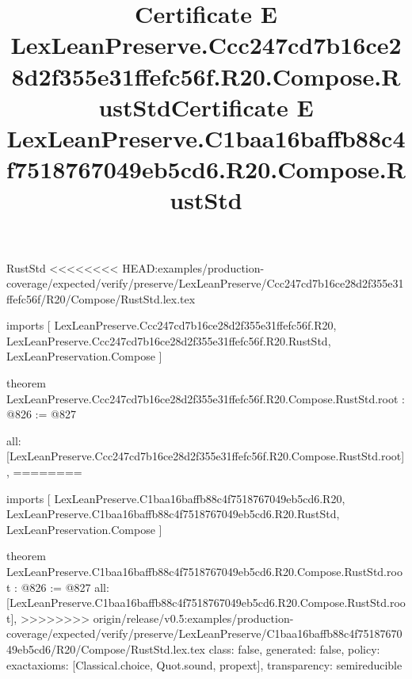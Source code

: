 \begin{lexlean}{RustStd}
<<<<<<<< HEAD:examples/production-coverage/expected/verify/preserve/LexLeanPreserve/Ccc247cd7b16ce28d2f355e31ffefc56f/R20/Compose/RustStd.lex.tex
\title{Certificate E LexLeanPreserve.Ccc247cd7b16ce28d2f355e31ffefc56f.R20.Compose.RustStd}
\begin{coremodule}
imports [
  LexLeanPreserve.Ccc247cd7b16ce28d2f355e31ffefc56f.R20,
  LexLeanPreserve.Ccc247cd7b16ce28d2f355e31ffefc56f.R20.RustStd,
  LexLeanPreservation.Compose
]

theorem LexLeanPreserve.Ccc247cd7b16ce28d2f355e31ffefc56f.R20.Compose.RustStd.root : @826 := @827 {
  all: [LexLeanPreserve.Ccc247cd7b16ce28d2f355e31ffefc56f.R20.Compose.RustStd.root],
========
\title{Certificate E LexLeanPreserve.C1baa16baffb88c4f7518767049eb5cd6.R20.Compose.RustStd}
\begin{coremodule}
imports [
  LexLeanPreserve.C1baa16baffb88c4f7518767049eb5cd6.R20,
  LexLeanPreserve.C1baa16baffb88c4f7518767049eb5cd6.R20.RustStd,
  LexLeanPreservation.Compose
]

theorem LexLeanPreserve.C1baa16baffb88c4f7518767049eb5cd6.R20.Compose.RustStd.root : @826 := @827 {
  all: [LexLeanPreserve.C1baa16baffb88c4f7518767049eb5cd6.R20.Compose.RustStd.root],
>>>>>>>> origin/release/v0.5:examples/production-coverage/expected/verify/preserve/LexLeanPreserve/C1baa16baffb88c4f7518767049eb5cd6/R20/Compose/RustStd.lex.tex
  class: false,
  generated: false,
  policy: exact{axioms: [Classical.choice, Quot.sound, propext]},
  transparency: semireducible
}


\end{coremodule}}
\end{coremodule}
\end{lexlean}

